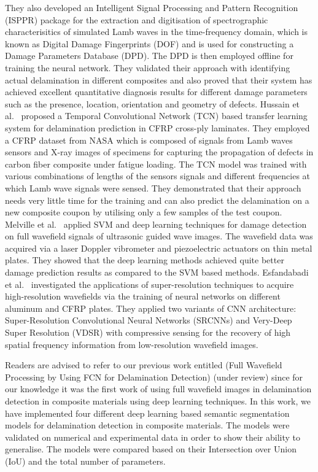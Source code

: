 They also developed an Intelligent Signal Processing and Pattern Recognition (ISPPR) package for the extraction and digitisation of spectrographic characterisitics of simulated Lamb waves in the time-frequency domain, which is known as Digital Damage Fingerprints (DOF) and is used for constructing a Damage Parameters Database (DPD). 
The DPD is then employed offline for training the neural network. 
They validated their approach with identifying actual delamination in different composites and also proved that their system has achieved excellent quantitative diagnosis results for different damage parameters such as the presence, location, orientation and geometry of defects. 
Hussain et al.~\cite{hussaintemporal} proposed a Temporal Convolutional Network (TCN) based transfer learning system for delamination prediction in CFRP cross-ply laminates. They employed a CFRP dataset from NASA which is composed of signals from Lamb waves sensors and X-ray images of specimens for capturing the propagation of defects in carbon fiber composite under fatigue loading. 
The TCN model was trained with various combinations of lengths of the sensors signals and different frequencies at which Lamb wave signals were sensed. 
They demonstrated that their approach needs very little time for the training and can also predict the delamination on a new composite coupon by utilising only a few samples of the test coupon. 
Melville et al.~\cite{melville2018structural} applied SVM and deep learning techniques for damage detection on full wavefield signals of ultrasonic guided wave images. The wavefield data was acquired via a laser Doppler vibrometer and piezoelectric actuators on thin metal plates. 
They showed that the deep learning methods achieved quite better damage prediction results as compared to the SVM based methods. 
Esfandabadi et al.~\cite{keshmiri2019deep} investigated the applications of super-resolution techniques to acquire high-resolution wavefields via the training of neural networks on different aluminum and CFRP plates. 
They applied two variants of CNN architecture: Super-Resolution Convolutional Neural Networks (SRCNNs) and Very-Deep Super Resolution (VDSR) with compressive sensing for the recovery of high spatial frequency information from low-resolution wavefield images.           

Readers are advised to refer to our previous work entitled (Full Wavefield Processing by Using FCN for Delamination Detection) (under review) since for our knowledge it was the first work of using full wavefield images in delamination detection in composite materials using deep learning techniques. 
In this work, we have implemented four different deep learning based semantic segmentation models for delamination detection in composite materials.
The models were validated on numerical and experimental data in order to show their ability to generalise.
The models were compared based on their Intersection over Union (IoU) and the total number of parameters.


